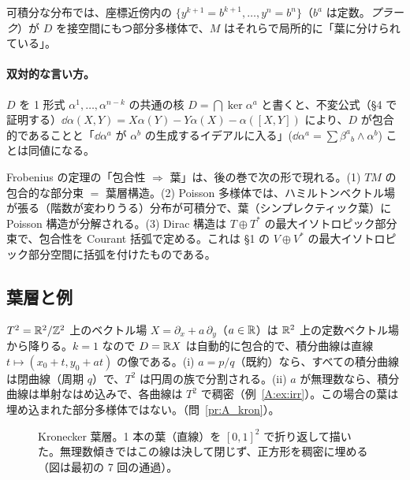 可積分な分布では、座標近傍内の $\{y^{k+1}=b^{k+1},\dots,y^n=b^n\}$（$b^a$ は定数。\emph{プラーク}）が $D$ を接空間にもつ部分多様体で、$M$ はそれらで局所的に「葉に分けられている」。

\paragraph{双対的な言い方。}$D$ を 1 形式 $\alpha^1,\dots,\alpha^{n-k}$ の共通の核 $D=\bigcap\ker\alpha^a$ と書くと、不変公式（§4 で証明する）$\dd\alpha(X,Y)=X\alpha(Y)-Y\alpha(X)-\alpha([X,Y])$ により、$D$ が包合的であることと「$\dd\alpha^a$ が $\alpha^b$ の生成するイデアルに入る」($\dd\alpha^a=\sum\beta^a{}_b\wedge\alpha^b$) ことは同値になる\tC。

\begin{rem}[後の巻との接点]
Frobenius の定理の「包合性 $\Rightarrow$ 葉」は、後の巻で次の形で現れる。(1) $TM$ の包合的な部分束 $=$ 葉層構造。(2) Poisson 多様体では、ハミルトンベクトル場が張る（階数が変わりうる）分布が可積分で、葉（シンプレクティック葉）に Poisson 構造が分解される。(3) Dirac 構造は $T\oplus T^*$ の最大イソトロピック部分束で、包合性を Courant 括弧で定める。これは §1 の $V\oplus V^*$ の最大イソトロピック部分空間に括弧を付けたものである。
\end{rem}

\subsection{葉層と例}
\begin{ex}[Kronecker 流]\label{A:ex:kronecker}
$T^2=\mathbb R^2/\mathbb Z^2$ 上のベクトル場 $X=\partial_x+a\,\partial_y$（$a\in\mathbb R$）は $\mathbb R^2$ 上の定数ベクトル場から降りる。$k=1$ なので $D=\mathbb R X$ は自動的に包合的で、積分曲線は直線 $t\mapsto(x_0+t,y_0+at)$ の像である。(i) $a=p/q$（既約）なら、すべての積分曲線は閉曲線（周期 $q$）で、$T^2$ は円周の族で分割される。(ii) $a$ が無理数なら、積分曲線は単射なはめ込みで、各曲線は $T^2$ で稠密（例~\ref{A:ex:irr}）。この場合の葉は埋め込まれた部分多様体ではない。（問~\ref{pr:A_kron}）。
\end{ex}

\begin{figure}[htbp]
\centering
{}
\caption{Kronecker 葉層。1 本の葉（直線）を $[0,1]^2$ で折り返して描いた。無理数傾きではこの線は決して閉じず、正方形を稠密に埋める（図は最初の 7 回の通過）。}
\end{figure}

